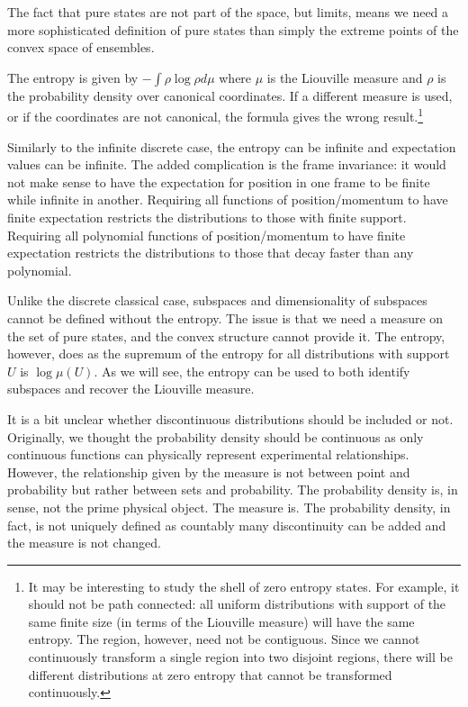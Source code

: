 The fact that pure states are not part of the space, but limits, means we need a more sophisticated definition of pure states than simply the extreme points of the convex space of ensembles.

The entropy is given by $- \int \rho \log \rho d\mu$ where $\mu$ is the Liouville measure and $\rho$ is the probability density over canonical coordinates. If a different measure is used, or if the coordinates are not canonical, the formula gives the wrong result.\footnote{It may be interesting to study the shell of zero entropy states. For example, it should not be path connected: all uniform distributions with support of the same finite size (in terms of the Liouville measure) will have the same entropy. The region, however, need not be contiguous. Since we cannot continuously transform a single region into two disjoint regions, there will be different distributions at zero entropy that cannot be transformed continuously.}


Similarly to the infinite discrete case, the entropy can be infinite and expectation values can be infinite. The added complication is the frame invariance: it would not make sense to have the expectation for position in one frame to be finite while infinite in another. Requiring all functions of position/momentum to have finite expectation restricts the distributions to those with finite support. Requiring all polynomial functions of position/momentum to have finite expectation restricts the distributions to those that decay faster than any polynomial.

Unlike the discrete classical case, subspaces and dimensionality of subspaces cannot be defined without the entropy. The issue is that we need a measure on the set of pure states, and the convex structure cannot provide it. The entropy, however, does as the supremum of the entropy for all distributions with support $U$ is $\log \mu(U)$. As we will see, the entropy can be used to both identify subspaces and recover the Liouville measure.

It is a bit unclear whether discontinuous distributions should be included or not. Originally, we thought the probability density should be continuous as only continuous functions can physically represent experimental relationships. However, the relationship given by the measure is not between point and probability but rather between sets and probability. The probability density is, in sense, not the prime physical object. The measure is. The probability density, in fact, is not uniquely defined as countably many discontinuity can be added and the measure is not changed.


